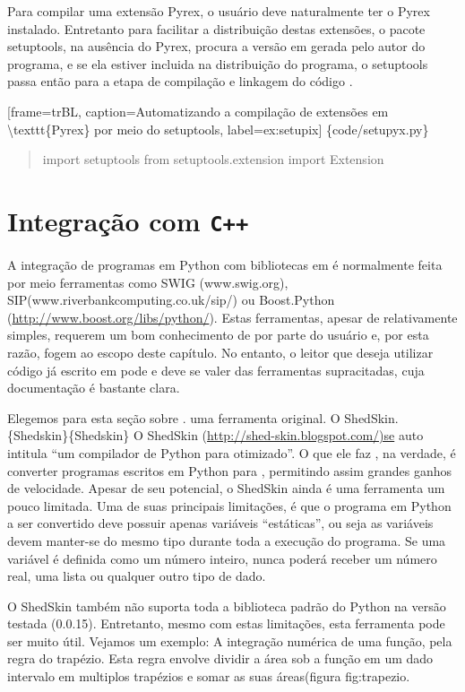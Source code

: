 \documentclass[a4paper,10pt,brazil]{sphinxmanual}
\begin{document}
Para compilar uma extensão Pyrex, o usuário deve naturalmente ter o
Pyrex instalado. Entretanto para facilitar a distribuição destas
extensões, o pacote setuptools, na ausência do Pyrex, procura a
versão em  gerada pelo autor do programa, e se ela estiver
incluida na distribuição do programa, o setuptools passa então para
a etapa de compilação e linkagem do código .

{[}frame=trBL, caption=Automatizando a compilação de extensões em \textbackslash{}texttt\{Pyrex\} por meio do setuptools, label=ex:setupix{]} \{code/setupyx.py\}
\begin{quote}

import setuptools from setuptools.extension import Extension
\end{quote}


\chapter{Integração com \texttt{C++}}
\label{capext:integracao-com-c}
A integração de programas em Python com bibliotecas em  é
normalmente feita por meio ferramentas como SWIG (www.swig.org),
SIP(www.riverbankcomputing.co.uk/sip/) ou Boost.Python
(\href{http://www.boost.org/libs/python/}{http://www.boost.org/libs/python/}). Estas ferramentas, apesar de
relativamente simples, requerem um bom conhecimento de  por
parte do usuário e, por esta razão, fogem ao escopo deste capítulo.
No entanto, o leitor que deseja utilizar código já escrito em
 pode e deve se valer das ferramentas supracitadas, cuja
documentação é bastante clara.

Elegemos para esta seção sobre . uma ferramenta original. O
ShedSkin. \{Shedskin\}\{Shedskin\} O ShedSkin
(\href{http://shed-skin.blogspot.com/)se}{http://shed-skin.blogspot.com/)se} auto intitula
``um compilador de Python para  otimizado''. O que ele faz ,
na verdade, é converter programas escritos em Python para ,
permitindo assim grandes ganhos de velocidade. Apesar de seu
potencial, o ShedSkin ainda é uma ferramenta um pouco limitada. Uma
de suas principais limitações, é que o programa em Python a ser
convertido deve possuir apenas variáveis ``estáticas'', ou seja as
variáveis devem manter-se do mesmo tipo durante toda a execução do
programa. Se uma variável é definida como um número inteiro, nunca
poderá receber um número real, uma lista ou qualquer outro tipo de
dado.

O ShedSkin também não suporta toda a biblioteca padrão do Python na
versão testada (0.0.15). Entretanto, mesmo com estas limitações,
esta ferramenta pode ser muito útil. Vejamos um exemplo: A
integração numérica de uma função, pela regra do trapézio. Esta
regra envolve dividir a área sob a função em um dado intervalo em
multiplos trapézios e somar as suas áreas(figura fig:trapezio.
\end{document}
